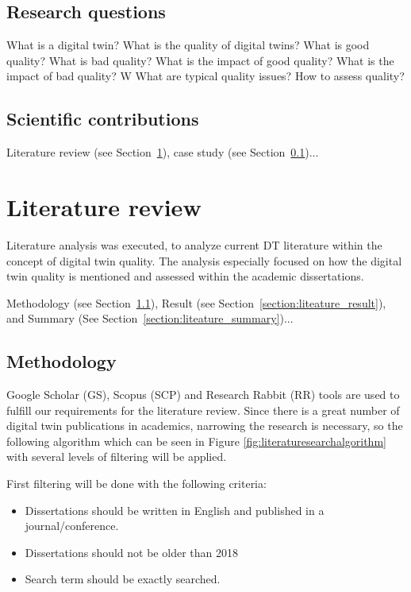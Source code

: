 \documentclass[9pt,conference]{IEEEtran}
\begin{document}
    \subsection{Research questions}
    \label{section: Research Questions}
    What is a digital twin?
    What is the quality of digital twins? 
    What is good quality?
    What is bad quality? 
    What is the impact of good quality? 
    What is the impact of bad quality? W
    What are typical quality issues? 
    How to assess quality?

    \subsection{Scientific contributions}
    Literature review (see Section~\ref{section: literature}), case study (see Section~\ref{section: Research Questions})...
    
    \section{Literature review}
    \label{section: literature}
    Literature analysis was executed, to analyze current DT literature within the concept of digital twin quality. The analysis especially focused on 
    how the digital twin quality is mentioned and assessed within the academic dissertations.

    Methodology (see Section~\ref{section:liteature_methodology}), Result (see Section~\ref{section:liteature_result}), and Summary (See Section~\ref{section:liteature_summary})...

    \subsection{Methodology}
    \label{section:liteature_methodology}
    Google Scholar (GS), Scopus (SCP) and Research Rabbit (RR) tools are used to fulfill our requirements for the literature review. 
    Since there is a great number of digital twin publications in academics, 
    narrowing the research is necessary, so the following algorithm which can be seen in Figure \ref{fig:literaturesearchalgorithm} with several levels of filtering will be applied.
    
    First filtering will be done with the following criteria:
    \begin{itemize}
        \item Dissertations should be written in English and published in a journal/conference.
        \item Dissertations should not be older than 2018
        \item Search term should be exactly searched.
    \end{itemize}
\end{document}
